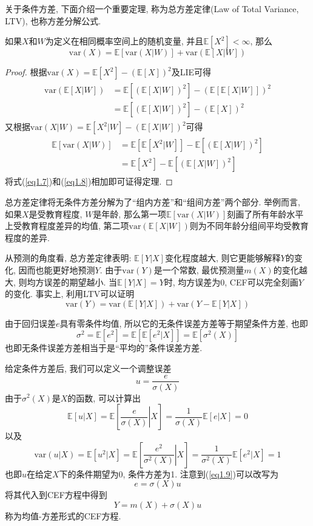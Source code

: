 \documentclass[cn, 12pt, math=mtpro2, bibstyle=apa, blue, twocol]{elegantbook}
\newcommand{\E}{\mathbb{E}}
\newcommand{\var}{\text{var}}
\begin{document}
关于条件方差, 下面介绍一个重要定理, 称为总方差定律(Law of Total Variance, LTV), 也称方差分解公式.
\begin{theorem}
  如果$X$和$W$为定义在相同概率空间上的随机变量, 并且$\E[X^2]<\infty$, 那么
  $$\text{var}(X)=\E[\text{var}(X|W)]+\text{var}(\E[X|W])$$
\end{theorem}
\begin{proof}
   根据$\var(X)=\E[X^2]-(\E[X])^2$及LIE可得
      \begin{align}\label{eq1.7}
      \begin{split}
      \var(\E[X|W])&=\E[(\E[X|W])^2]-(\E[\E[X|W]])^2 \\
      &=\E[(\E[X|W])^2]-(\E[X])^2
      \end{split}
      \end{align}
      又根据$\var(X|W)=\E[X^2|W]-(\E[X|W])^2$可得
      \begin{align}\label{eq1.8}
      \begin{split}
      \E[\var(X|W)]&=\E[\E[X^2|W]]-\E[(\E[X|W])^2]  \\
      &=\E[X^2]-\E[(\E[X|W])^2]
      \end{split}
      \end{align}
      将式(\ref{eq1.7})和(\ref{eq1.8})相加即可证得定理.
\end{proof}
总方差定律将无条件方差分解为了“组内方差”和“组间方差”两个部分. 举例而言, 如果$X$是受教育程度, $W$是年龄, 那么第一项$\E[\var(X|W)]$刻画了所有年龄水平上受教育程度差异的均值, 第二项$\var(\E[X|W])$则为不同年龄分组间平均受教育程度的差异.

从预测的角度看, 总方差定律表明: $\E[Y|X]$变化程度越大, 则它更能够解释$Y$的变化, 因而也能更好地预测$Y$. 由于$\text{var}(Y)$是一个常数, 最优预测量$m(X)$的变化越大, 则均方误差的期望越小. 当$\E[Y|X]=Y$时, 均方误差为0, CEF可以完全刻画$Y$的变化. 事实上, 利用LTV可以证明
$$\var(Y)=\var(\E[Y|X])+\var(Y-\E[Y|X])$$

由于回归误差$e$具有零条件均值, 所以它的无条件误差方差等于期望条件方差, 也即
$$\sigma^2=\E[e^2]=\E[\E[e^2|X]]=\E[\sigma^2(X)]$$
也即无条件误差方差相当于是“平均的”条件误差方差.

给定条件方差后, 我们可以定义一个调整误差
\begin{equation}\label{eq1.9}
  u=\frac{e}{\sigma(X)}
\end{equation}
由于$\sigma^2(X)$是$X$的函数, 可以计算出
$$\E[u|X]=\E\left[\left.\frac{e}{\sigma(X)}\right|X\right]=\frac{1}{\sigma(X)}\E[e|X]=0$$
以及
$$\var(u|X)=\E[u^2|X]=\E\left[\left.\frac{e^2}{\sigma^2(X)}\right|X\right]=\frac{1}{\sigma^2(X)}\E[e^2|X]=1$$
也即$u$在给定$X$下的条件期望为0, 条件方差为1. 注意到(\ref{eq1.9})可以改写为
$$e=\sigma(X)u$$
将其代入到CEF方程中得到
$$Y=m(X)+\sigma(X)u$$
称为均值-方差形式的CEF方程.
\end{document}
